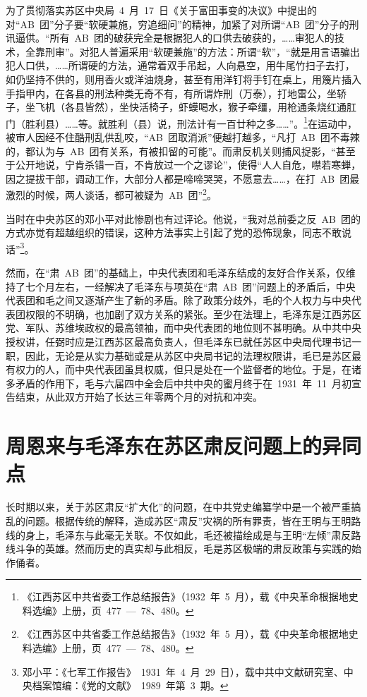 为了贯彻落实苏区中央局~4~月~17~日《关于富田事变的决议》中提出的对“AB~团”分子要“软硬兼施，穷追细问”的精神，加紧了对所谓“AB~团”分子的刑讯逼供。“所有~AB~团的破获完全是根据犯人的口供去破获的，……审犯人的技术，全靠刑审”。对犯人普遍采用“软硬兼施”的方法：所谓“软”，“就是用言语骗出犯人口供，……所谓硬的方法，通常着双手吊起，人向悬空，用牛尾竹扫子去打，如仍坚持不供的，则用香火或洋油烧身，甚至有用洋钉将手钉在桌上，用篾片插入手指甲内，在各县的刑法种类无奇不有，有所谓炸刑（万泰），打地雷公，坐轿子，坐飞机（各县皆然），坐快活椅子，虾蟆喝水，猴子牵缰，用枪通条烧红通肛门（胜利县）……等。就胜利（县）说，刑法计有一百廿种之多……”。\footnote{《江西苏区中共省委工作总结报告》（1932~年~5~月），载《中央革命根据地史料选编》上册，页~477~—~78、480。}在运动中，被审人因经不住酷刑乱供乱咬，“AB~团取消派”便越打越多，“凡打~AB~团不毒辣的，都认为与~AB~团有关系，有被扣留的可能”。而肃反机关则捕风捉影，“甚至于公开地说，宁肯杀错一百，不肯放过一个之谬论”，使得“人人自危，噤若寒蝉，因之提拔干部，调动工作，大部分人都是啼啼哭哭，不愿意去……，在打~AB~团最激烈的时候，两人谈话，都可被疑为~AB~团”\footnote{《江西苏区中共省委工作总结报告》（1932~年~5~月），载《中央革命根据地史料选编》上册，页~477~—~78、480。}。

当时在中央苏区的邓小平对此惨剧也有过评论。他说，“我对总前委之反~AB~团的方式亦觉有超越组织的错误，这种方法事实上引起了党的恐怖现象，同志不敢说话”\footnote{邓小平：《七军工作报告》~1931~年~4~月~29~日），载中共中文献研究室、中央档案馆编：《党的文献》~1989~年第~3~期。}。

然而，在“肃~AB~团”的基础上，中央代表团和毛泽东结成的友好合作关系，仅维持了七个月左右，一经解决了毛泽东与项英在“肃~AB~团”问题上的矛盾后，中央代表团和毛之间又逐渐产生了新的矛盾。除了政策分歧外，毛的个人权力与中央代表团权限的不明确，也加剧了双方关系的紧张。至少在法理上，毛泽东是江西苏区党、军队、苏维埃政权的最高领袖，而中央代表团的地位则不甚明确。从中共中央授权讲，任弼时应是江西苏区最高负责人，但毛泽东已就任苏区中央局代理书记一职，因此，无论是从实力基础或是从苏区中央局书记的法理权限讲，毛已是苏区最有权力的人，而中央代表团虽具权威，但只是处在一个监督者的地位。于是，在诸多矛盾的作用下，毛与六届四中全会后中共中央的蜜月终于在~1931~年~11~月初宣告结束，从此双方开始了长达三年零两个月的对抗和冲突。

\section{周恩来与毛泽东在苏区肃反问题上的异同点}

长时期以来，关于苏区肃反“扩大化”的问题，在中共党史编纂学中是一个被严重搞乱的问题。根据传统的解释，造成苏区“肃反”灾祸的所有罪责，皆在王明与王明路线的身上，毛泽东与此毫无关联。不仅如此，毛还被描绘成是与王明“左倾”肃反路线斗争的英雄。然而历史的真实却与此相反，毛是苏区极端的肃反政策与实践的始作俑者。

